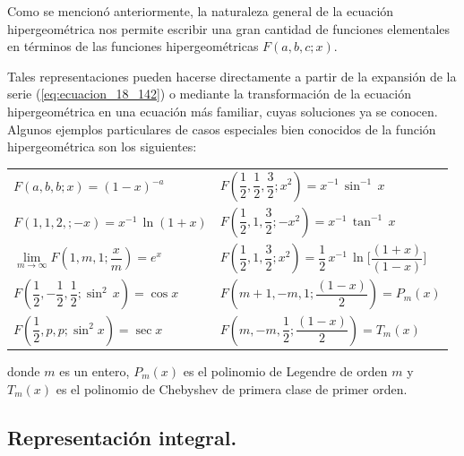 Como se mencionó anteriormente, la naturaleza general de la ecuación hipergeométrica nos permite escribir una gran cantidad de funciones elementales en términos de las funciones hipergeométricas $F (a, b, c; x)$.
\par
Tales representaciones pueden hacerse directamente a partir de la expansión de la serie (\ref{eq:ecuacion_18_142}) o mediante la transformación de la ecuación hipergeométrica en una ecuación más familiar, cuyas soluciones ya se conocen. Algunos ejemplos particulares de casos especiales bien conocidos de la función hipergeométrica son los siguientes:
\begin{table}[H]
\centering
\fontsize{14}{14}\selectfont
\begin{tabular}{p{7cm} p{8.15cm}}
$F(a, b, b; x) = (1 - x)^{-a}$ & $F \left( \dfrac{1}{2}, \dfrac{1}{2}, \dfrac{3}{2}; x^{2} \right) = x^{-1} \, \sin^{-1} \, x$ \\[1.5em]
$F(1, 1, 2,; -x) = x^{-1} \, \ln (1 + x)$ & $F \left( \dfrac{1}{2}, 1, \dfrac{3}{2}; -x^{2} \right) = x^{-1} \, \tan^{-1} \, x$ \\[1.5em]
$\lim\limits_{m \to \infty} F \left(1, m, 1; \dfrac{x}{m}\right) = e^{x}$ & $F \left( \dfrac{1}{2}, 1, \dfrac{3}{2}; x^{2} \right) = \dfrac{1}{2} \, x^{-1} \, \ln \bigg[ \dfrac{(1 + x)}{(1 - x)} \bigg]$ \\[1.5em]
$F \left( \dfrac{1}{2}, -\dfrac{1}{2}, \dfrac{1}{2}; \sin^{2} \, x \right) = \cos x$ & $F \left(m+1, -m, 1; \dfrac{(1 - x)}{2}\right) = P_{m} (x)$ \\[1.5em]
$F \left( \dfrac{1}{2}, p, p; \sin^{2} x \right) = \sec x$ & $F \left( m, -m, \dfrac{1}{2}; \dfrac{(1- x)}{2} \right) = T_{m} (x)$
\end{tabular}
\end{table}
donde $m$ es un entero, $P_{m}(x)$ es el polinomio de Legendre de orden $m$ y $T_{m}(x)$ es el polinomio de Chebyshev de primera clase de primer orden.

\subsection{Representación integral.}


